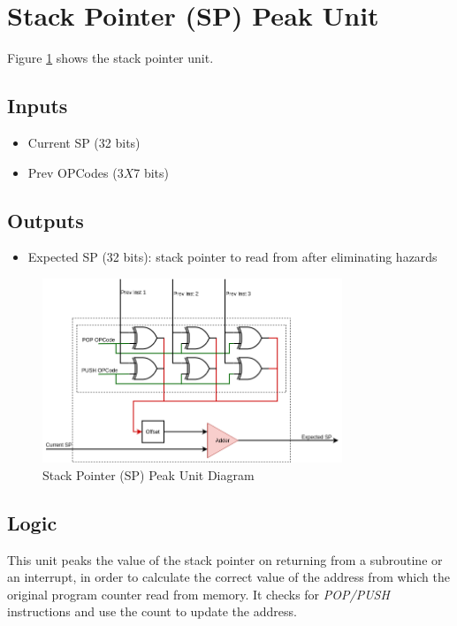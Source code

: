 \documentclass[12pt]{report}
\begin{document}
\section{Stack Pointer (SP) Peak Unit}
Figure \ref{fig:pspu} shows the stack pointer unit.

\subsection{Inputs}
\begin{itemize}
    \item Current SP (32 bits)
    \item Prev OPCodes (3$X$7 bits)
\end{itemize}

\subsection{Outputs}
\begin{itemize}
    \item Expected SP (32 bits): stack pointer to read from after eliminating hazards
\end{itemize}

\begin{center}
    \begin{figure}[hp]
        \centering
        \includegraphics[width=0.8\textwidth]{pspu}
        \caption{Stack Pointer (SP) Peak Unit Diagram}
        \label{fig:pspu}
    \end{figure}
\end{center}

\subsection{Logic}
This unit peaks the value of the stack pointer on returning from a subroutine or an interrupt, in order to calculate the correct value of the address from which the original program counter read from memory. It checks for \emph{POP/PUSH} instructions and use the count to update the address.
\end{document}
